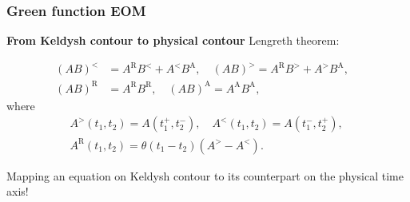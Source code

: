 \documentclass[t]{beamer}
\begin{document}
\begin{frame}
\frametitle{Green function EOM}

\textbf{From Keldysh contour to physical contour} Lengreth theorem: 

\begin{equation}
    \begin{aligned}
        (AB)^< &= A^{\text{R}} B^< + A^< B^{\text{A}}, \quad 
        (AB)^> = A^{\text{R}} B^> + A^> B^{\text{A}}, \quad \\
        (AB)^{\text{R}} &= A^{\text{R}} B^{\text{R}}, \quad 
        (AB)^{\text{A}} = A^{\text{A}} B^{\text{A}},
    \end{aligned}
\end{equation}
where
\begin{equation}
    \begin{aligned}
        &A^>(t_1, t_2) = A(t_1^+, t_2^-), \quad 
        A^<(t_1, t_2) = A(t_1^-, t_2^+), \quad \\
        &A^{\text{R}}(t_1, t_2) = \theta(t_1 - t_2) (A^> - A^<).
    \end{aligned}
\end{equation}

Mapping an equation on Keldysh contour to its counterpart on the physical time axis!


\end{frame}
\end{document}
